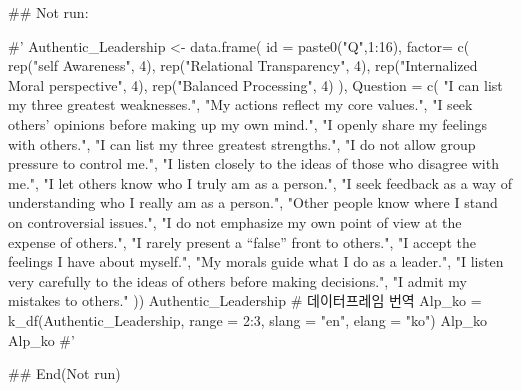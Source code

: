 \documentclass[a4paper]{book}
\begin{document}
\begin{Examples}
\begin{ExampleCode}

\#\# Not run: 

#'
Authentic_Leadership <- data.frame(
  id = paste0("Q",1:16),
  factor= c(
    rep("self Awareness", 4),
    rep("Relational Transparency", 4),
    rep("Internalized Moral perspective", 4),
    rep("Balanced Processing", 4)
  ),
  Question = c(
    "I can list my three greatest weaknesses.",
    "My actions reflect my core values.",
    "I seek others' opinions before making up my own mind.",
    "I openly share my feelings with others.",
    "I can list my three greatest strengths.",
    "I do not allow group pressure to control me.",
    "I listen closely to the ideas of those who disagree with me.",
    "I let others know who I truly am as a person.",
    "I seek feedback as a way of understanding who I really am as a person.",
    "Other people know where I stand on controversial issues.",
    "I do not emphasize my own point of view at the expense of others.",
    "I rarely present a “false” front to others.",
    "I accept the feelings I have about myself.",
    "My morals guide what I do as a leader.",
    "I listen very carefully to the ideas of others before making decisions.",
    "I admit my mistakes to others."
  ))%
Authentic_Leadership
# 데이터프레임 번역
Alp_ko = k_df(Authentic_Leadership,
              range = 2:3,
              slang = "en",
              elang = "ko") %
Alp_ko
Alp_ko %
#'






## End(Not run)




\end{ExampleCode}
\end{Examples}
\end{document}
